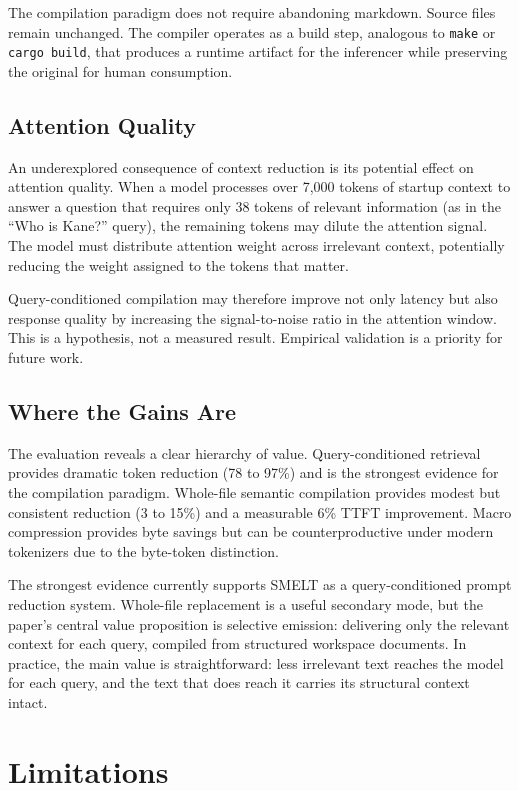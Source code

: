 \documentclass[11pt,a4paper]{article}
\begin{document}
The compilation paradigm does not require abandoning markdown. Source files remain unchanged. The compiler operates as a build step, analogous to \texttt{make} or \texttt{cargo build}, that produces a runtime artifact for the inferencer while preserving the original for human consumption.

\subsection{Attention Quality}

An underexplored consequence of context reduction is its potential effect on attention quality. When a model processes over 7,000 tokens of startup context to answer a question that requires only 38 tokens of relevant information (as in the ``Who is Kane?'' query), the remaining tokens may dilute the attention signal. The model must distribute attention weight across irrelevant context, potentially reducing the weight assigned to the tokens that matter.

Query-conditioned compilation may therefore improve not only latency but also response quality by increasing the signal-to-noise ratio in the attention window. This is a hypothesis, not a measured result. Empirical validation is a priority for future work.

\subsection{Where the Gains Are}

The evaluation reveals a clear hierarchy of value. Query-conditioned retrieval provides dramatic token reduction (78 to 97\%) and is the strongest evidence for the compilation paradigm. Whole-file semantic compilation provides modest but consistent reduction (3 to 15\%) and a measurable 6\% TTFT improvement. Macro compression provides byte savings but can be counterproductive under modern tokenizers due to the byte-token distinction.

The strongest evidence currently supports SMELT as a query-conditioned prompt reduction system. Whole-file replacement is a useful secondary mode, but the paper's central value proposition is selective emission: delivering only the relevant context for each query, compiled from structured workspace documents. In practice, the main value is straightforward: less irrelevant text reaches the model for each query, and the text that does reach it carries its structural context intact.

\section{Limitations}
\end{document}
